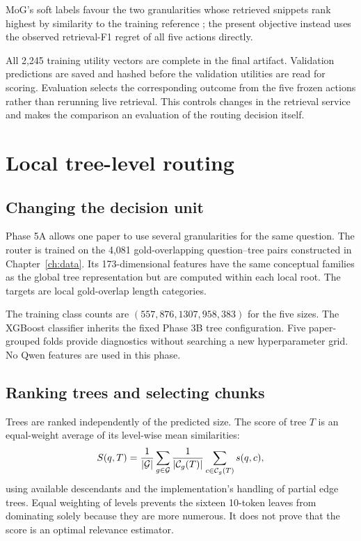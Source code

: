 MoG's soft labels favour the two granularities whose retrieved snippets
rank highest by similarity to the training reference
\cite{zhong-etal-2025-mix}; the present objective instead uses the
observed retrieval-F1 regret of all five actions directly.

All 2,245 training utility vectors are complete in the final artifact.
Validation predictions are saved and hashed before the validation
utilities are read for scoring. Evaluation selects the corresponding
outcome from the five frozen actions rather than rerunning live
retrieval. This controls changes in the retrieval service and makes
the comparison an evaluation of the routing decision itself.

\section{Local tree-level routing}
\subsection{Changing the decision unit}
Phase 5A allows one paper to use several granularities for the same
question. The router is trained on the 4,081 gold-overlapping
question--tree pairs constructed in Chapter~\ref{ch:data}. Its
173-dimensional features have the same conceptual families as the
global tree representation but are computed within each local root.
The targets are local gold-overlap length categories.

The training class counts are $(557,876,1307,958,383)$ for the five
sizes. The XGBoost classifier inherits the fixed Phase 3B tree
configuration. Five paper-grouped folds provide diagnostics without
searching a new hyperparameter grid. No Qwen features are used in
this phase.

\subsection{Ranking trees and selecting chunks}
Trees are ranked independently of the predicted size. The score of
tree $T$ is an equal-weight average of its level-wise mean similarities:
\begin{equation}
S(q,T)=\frac{1}{|\mathcal{G}|}
\sum_{g\in\mathcal{G}}
\frac{1}{|\mathcal{C}_g(T)|}
\sum_{c\in\mathcal{C}_g(T)}s(q,c),
\label{eq:treescore}
\end{equation}
using available descendants and the implementation's handling of
partial edge trees. Equal weighting of levels prevents the sixteen
10-token leaves from dominating solely because they are more numerous.
It does not prove that the score is an optimal relevance estimator.

